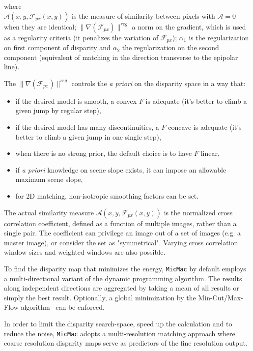 \documentclass[twocolumn]{bmcart}%
\newcommand{\Ress}{\ensuremath{{\mathcal A}}}
\newcommand{\FPx}{\ensuremath{{\mathcal F}_{px}}}
\begin{document}
where\\
$\Ress(x,y,\FPx(x,y))$ is the measure of similarity between pixels with $\Ress=0$ when they are identical; $\| \nabla(\FPx) \|^{reg}$ a norm on the gradient, which is used as
 a regularity criteria (it penalizes the variation of \FPx); $\alpha_1$ is the regularization on first component of disparity and $\alpha_2$ the regularization  on the second component (equivalent of matching in the direction transverse to the epipolar line).\par 
%
\vspace{0.5cm}
The $\| \nabla(\FPx) \|^{reg}$ controls the \textit{a priori} on the disparity space in a way that:

\begin{itemize}
   \item  if the desired model is smooth, a convex   $F$  is adequate (it's better to
          climb a given jump by regular step),

   \item  if  the desired model has many discontinuities, a $F$   concave is adequate
          (it's better to climb a given jump in one single step),

   \item when there is no strong prior, the  default choice is to have $F$ linear,

   \item if \textit{a priori} knowledge on scene slope exists, it can impose an allowable maximum scene slope,
   \item for 2D matching, non-isotropic smoothing factors can be set. 
\end{itemize}
%
The actual similarity measure $\Ress(x,y,\FPx(x,y))$ is the normalized cross correlation coefficient, defined as a function of multiple images, rather than a single pair. The coefficient can privilege an image out of a set of images (e.g. a master image), or consider the set as "symmetrical". Varying cross correlation window sizes and weighted windows are also possible.\par 
%
To find the disparity map that minimizes the energy, {\tt MicMac} by default employs a multi-directional variant of the dynamic programming algorithm. The results along independent directions are aggregated by taking a mean of all results or simply the best result. Optionally, a global minimization by the Min-Cut/Max-Flow algorithm~\cite{roy1998maximum} can be enforced.\par 
%
In order to limit the disparity search-space, speed up the calculation and to reduce the noise,  {\tt MicMac} adopts a multi-resolution matching approach where coarse resolution disparity maps serve as predictors of the fine resolution output.\par 
% 
\end{document}
